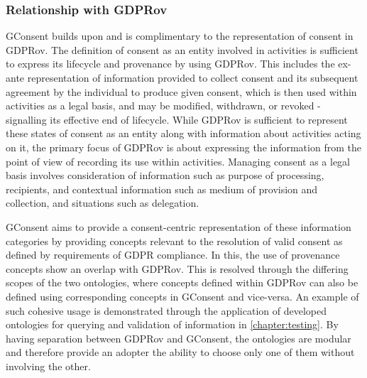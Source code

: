 \subsubsection{Relationship with GDPRov}
GConsent builds upon and is complimentary to the representation of consent in GDPRov.
The definition of consent as an entity involved in activities is sufficient to express its lifecycle and provenance by using GDPRov. This includes the ex-ante representation of information provided to collect consent and its subsequent agreement by the individual to produce given consent, which is then used within activities as a legal basis, and may be modified, withdrawn, or revoked - signalling its effective end of lifecycle.
While GDPRov is sufficient to represent these states of consent as an entity along with information about activities acting on it, the primary focus of GDPRov is about expressing the information from the point of view of recording its use within activities.
Managing consent as a legal basis involves consideration of information such as purpose of processing, recipients, and contextual information such as medium of provision and collection, and situations such as delegation.

GConsent aims to provide a consent-centric representation of these information categories by providing concepts relevant to the resolution of valid consent as defined by requirements of GDPR compliance. In this, the use of provenance concepts show an overlap with GDPRov.
This is resolved through the differing scopes of the two ontologies, where concepts defined within GDPRov can also be defined using corresponding concepts in GConsent and vice-versa. An example of such cohesive usage is demonstrated through the application of developed ontologies for querying and validation of information in \autoref{chapter:testing}.
By having separation between GDPRov and GConsent, the ontologies are modular and therefore provide an adopter the ability to choose only one of them without involving the other.

